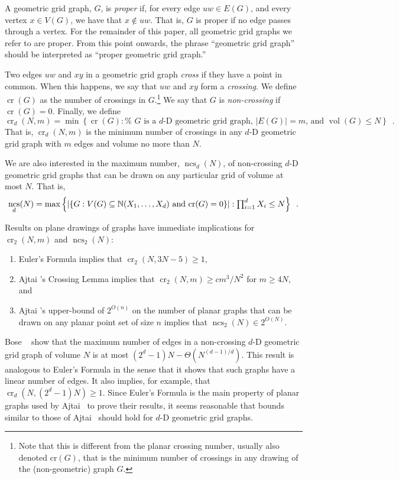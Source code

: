 \documentclass{patmorin}
\newcommand{\n}{N}
\DeclareMathOperator{\crs}{cr}
\DeclareMathOperator{\ncs}{ncs}
\DeclareMathOperator{\volume}{vol}
\begin{document}
A geometric grid graph, $G$, is \emph{proper} if, for every edge $uw\in
E(G)$, and every vertex $x\in V(G)$, we have that $x\not\in uw$.  That is,
$G$ is proper if no edge passes through a vertex.  For the remainder of
this paper, all geometric grid graphs we refer to are proper.  From this
point onwards, the phrase ``geometric grid graph'' should be interpreted
as ``proper geometric grid graph.''

Two edges $uw$ and $xy$ in a geometric grid graph \emph{cross} if they have a
point in common.  When this happens, we say that $uw$ and $xy$ form
a \emph{crossing}.  We define $\crs(G)$ as the number of crossings
in $G$.\footnote{Note that this is different from the planar crossing
number, usually also denoted $\mathrm{cr}(G)$, that is the minimum number of
crossings in any drawing of the (non-geometric) graph $G$.}  We say that
$G$ is \emph{non-crossing} if $\crs(G)=0$.  Finally, we define
\[ \crs_d(\n,m)=\min\left\{\crs(G):\mbox{%
    $G$ is a $d$-D geometric grid graph, $|E(G)|=m$, and $\volume(G)\le\n$}
   \right\} \enspace .
\]
That is, $\crs_d(\n,m)$ is the minimum number of crossings in any
$d$-D geometric grid graph with $m$ edges and volume no more
than $\n$.

We are also interested in the maximum number, $\ncs_d(\n)$, of non-crossing
$d$-D geometric grid graphs that can be drawn on any particular grid of
volume at most $\n$.  That is,
\[
  \ncs_d(\n) = \max\left\{
     \left|\left\{G:\mbox{$V(G)\subseteq\N(X_1,\ldots,X_d)$
            and $\crs(G)=0$} \right\}\right| :
    \mbox{$\prod_{i=1}^d X_i \le\n$} \right\} \enspace .
\]

Results on plane drawings of graphs have immediate implications
for $\crs_2(\n,m)$ and $\ncs_2(\n)$:
\begin{enumerate}
  \item  Euler's Formula implies that $\crs_2(\n,3\n-5)\ge 1$,
  \item  Ajtai \etal's Crossing Lemma implies that $\crs_2(\n,m)\ge
  cm^3/\n^2$ for $m\ge 4\n$, and
  \item  Ajtai \etal's upper-bound of $2^{O(n)}$ on the number of planar
  graphs that can be drawn on any planar point set of size $n$ implies that
  $\ncs_2(\n)\in 2^{O(\n)}$.
\end{enumerate}

Bose \etal~\cite{bose.czyzowicz.ea:maximum} show that the maximum number
of edges in a non-crossing $d$-D geometric grid graph of volume $\n$ is at
most $(2^d-1)\n-\Theta(\n^{(d-1)/d})$. This result is analogous to Euler's
Formula in the sense that it shows that such graphs have a linear number
of edges.  It also implies, for example, that $\crs_d(\n,(2^d-1)\n)\ge 1$.
Since Euler's Formula is the main property of planar graphs used by Ajtai
\etal\ to prove their results, it seems reasonable that bounds similar
to those of Ajtai \etal\ should hold for $d$-D geometric grid graphs.
\end{document}
